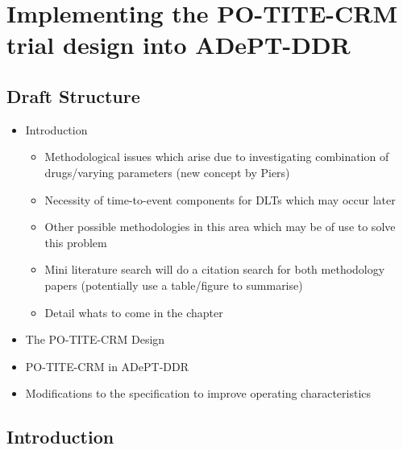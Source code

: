
\chapter{Implementing the PO-TITE-CRM trial design into ADePT-DDR} %

\label{Chapter2} %

\section{Draft Structure}
\begin{itemize}
	\item Introduction 
		\begin{itemize}
			\item Methodological issues which arise due to investigating combination of drugs/varying parameters (new concept by Piers)
			\item Necessity of time-to-event components for DLTs which may occur later 
			\item Other possible methodologies in this area which may be of use to solve this problem
			\item Mini literature search will do a citation search for both methodology papers (potentially use a table/figure to summarise) 
			\item Detail whats to come in the chapter
		\end{itemize}
	\item The PO-TITE-CRM Design
	\item PO-TITE-CRM in ADePT-DDR 
	\item Modifications to the specification to improve operating characteristics 
	
\end{itemize}


\section{Introduction}

